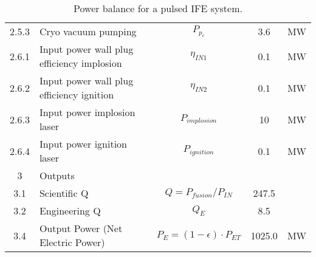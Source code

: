 \begin{table}[ht!]
\begin{tabular}{|c|p{5cm}|c|c|c|}
2.5.3	&	Cryo vacuum pumping	&	$P_{{p}_c}$	&	3.6	&	MW \\
2.6.1	& Input power wall plug efficiency implosion &	$\eta_{IN1}$ & 0.1	&	MW \\
2.6.2	& Input power wall plug efficiency ignition &	$\eta_{IN2}$& 0.1	&	MW \\
2.6.3	& Input power implosion laser	& $P_{implosion}$	&	10	&	MW \\
2.6.4	& Input power ignition laser	& $P_{ignition}$	&	0.1	&	MW \\
\hline								
3	&	Outputs	&		&		&	\\
\hline
3.1	&	Scientific Q	&	$Q = P_{{fusion}}/P_{{IN}}$	&	247.5	&	\\
3.2	&	Engineering Q	&	$Q_{{E}}$	&	8.5	&	\\
3.4	&	Output Power (Net Electric Power)	&	$P_{{E}} = (1 - \epsilon) \cdot P_{{ET}}$	&	1025.0	&	MW \\
\hline								
\end{tabular}	
\caption{Power balance for a pulsed IFE system.}
\label{tab:powerbalance}
\end{table}





